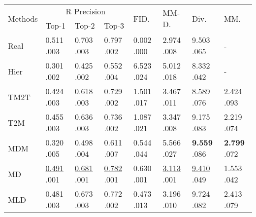 \documentclass[10pt,twocolumn,letterpaper]{article}
\begin{document}
\begin{table*}[ht]

\begin{center}
\begin{tabular}{p{2.15cm}p{1.70cm}p{1.70cm}p{1.70cm}p{1.70cm}p{1.70cm}p{1.70cm}p{1.70cm}}
\hline
\multirow{2}{*}{Methods}&\multicolumn{3}{c}{R Precision}&\multirow{2}{*}{FID.}&\multirow{2}{*}{MM-D.}& \multirow{2}{*}{Div.}& \multirow{2}{*}{MM.}\\ \cline{2-4}
& Top-1& Top-2& Top-3&&&&\\
\hline

 Real& 0.511 \scriptsize  .003& 0.703  \scriptsize  .003& 0.797  \scriptsize  .002& 0.002  \scriptsize  .000&2.974  \scriptsize  .008 &9.503 \scriptsize  .065 &-\\
 \hline

Hier~\cite{ghosh2021synthesis} & 0.301 \scriptsize  .002& 0.425  \scriptsize  .002& 0.552  \scriptsize  .004& 6.523  \scriptsize  .024&5.012  \scriptsize  .018 &8.332 \scriptsize  .042 &-\\

TM2T~\cite{guo2022tm2t} & 0.424 \scriptsize  .003& 0.618  \scriptsize  .003& 0.729  \scriptsize  .002& 1.501  \scriptsize  .017&3.467  \scriptsize  .011 &8.589 \scriptsize  .076 &2.424 \scriptsize  .093\\

T2M~\cite{guo2022generating} & 0.455 \scriptsize  .003& 0.636  \scriptsize  .003& 0.736  \scriptsize  .002& 1.087  \scriptsize  .021&3.347  \scriptsize  .008 &9.175 \scriptsize  .083 &2.219 \scriptsize  .074\\

MDM~\cite{tevet2023human} & 0.320 \scriptsize  .005& 0.498  \scriptsize  .004& 0.611  \scriptsize  .007& 0.544  \scriptsize  .044&5.566 \scriptsize  .027 &\textbf{9.559} \scriptsize  .086 &\textbf{2.799} \scriptsize  .072\\

MD~\cite{zhang2022motiondiffuse} & \underline{0.491} \scriptsize  .001& \underline{0.681}  \scriptsize  .001& \underline{0.782}  \scriptsize  .001& 0.630  \scriptsize  .001&\underline{3.113}  \scriptsize  .001 &\underline{9.410} \scriptsize  .049 &1.553 \scriptsize  .042\\

MLD~\cite{chen2023mld} & 0.481 \scriptsize  .003& 0.673 \scriptsize  .003& 0.772  \scriptsize  .002& 0.473  \scriptsize  .013&3.196  \scriptsize  .010 &9.724 \scriptsize  .082 &2.413 \scriptsize  .079\\ 


\end{tabular}
\end{center}
\end{table*}
\end{document}
